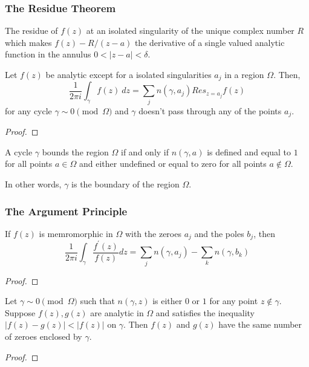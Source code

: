 \subsubsection{The Residue Theorem}
\begin{definition}
	The residue of $f(z)$ at an isolated singularity of the unique complex number $R$ which makes $f(z)-R/(z-a)$ the derivative of a single valued analytic function in the annulus $0<|z-a|<\delta$.
\end{definition}
\begin{theorem}
	Let $f(z)$ be analytic except for a isolated singularities $a_j$ in a region $\Omega$.
	Then,
	\begin{equation}
		\frac{1}{2\pi i} \int_\gamma f(z)\ dz = \sum_j n(\gamma,a_j) Res_{z=a_j} f(z) 
	\end{equation}
	for any cycle $\gamma \sim 0 \!\!\! \pmod{\Omega}$ and $\gamma$ doesn't pass through any of the points $a_j$.
\end{theorem}
\begin{proof}
\end{proof}

\begin{definition}
	A cycle $\gamma$ bounds the region $\Omega$ if and only if $n(\gamma,a)$ is defined and equal to $1$ for all points $a \in \Omega$ and either undefined or equal to zero for all points $a \notin \Omega$.
\end{definition}
\begin{commentary}
	In other words, $\gamma$ is the boundary of the region $\Omega$.
\end{commentary}

\subsubsection{The Argument Principle}
\begin{theorem}
	If $f(z)$ is memromorphic in $\Omega$ with the zeroes $a_j$ and the poles $b_j$, then
	\begin{equation}
		\frac{1}{2\pi i} \int_\gamma \frac{f^\prime(z)}{f(z)} dz = \sum_j n(\gamma,a_j) - \sum_k n(\gamma,b_k)
	\end{equation}
\end{theorem}
\begin{proof}
\end{proof}

\begin{corollary}[Rouch\'e]
	Let $\gamma \sim 0 \pmod{\Omega}$ such that $n(\gamma,z)$ is either $0$ or $1$ for any point $z \notin \gamma$.
	Suppose $f(z), g(z)$ are analytic in $\Omega$ and satisfies the inequality $|f(z)-g(z)| < |f(z)|$ on $\gamma$.
	Then $f(z)$ and $g(z)$ have the same number of zeroes enclosed by $\gamma$.
\end{corollary}
\begin{proof}
\end{proof}
